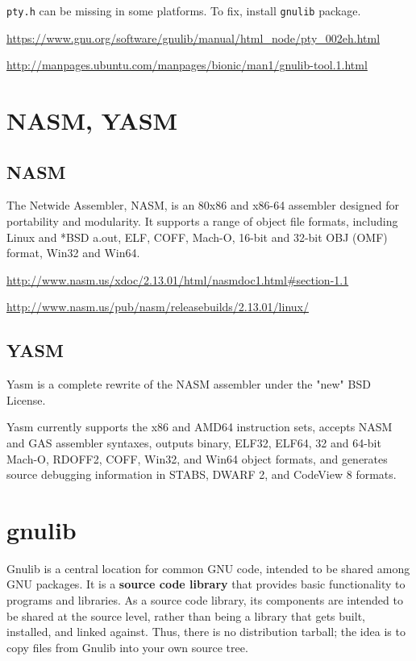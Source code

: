 \verb!pty.h! can be missing in some platforms. To fix, install \verb!gnulib! package.

\url{https://www.gnu.org/software/gnulib/manual/html_node/pty_002eh.html}

\url{http://manpages.ubuntu.com/manpages/bionic/man1/gnulib-tool.1.html}

\section{NASM, YASM}


\subsection{NASM}
\label{sec:NASM}

The Netwide Assembler, NASM, is an 80x86 and x86-64 assembler designed for
portability and modularity. It supports a range of object file formats,
including Linux and *BSD a.out, ELF, COFF, Mach-O, 16-bit and 32-bit OBJ (OMF)
format, Win32 and Win64.  

\url{http://www.nasm.us/xdoc/2.13.01/html/nasmdoc1.html#section-1.1}

\url{http://www.nasm.us/pub/nasm/releasebuilds/2.13.01/linux/}

\subsection{YASM}
\label{sec:YASM}

Yasm is a complete rewrite of the NASM assembler under the "new" BSD License.

Yasm currently supports the x86 and AMD64 instruction sets, accepts NASM and GAS
assembler syntaxes, outputs binary, ELF32, ELF64, 32 and 64-bit Mach-O, RDOFF2,
COFF, Win32, and Win64 object formats, and generates source debugging
information in STABS, DWARF 2, and CodeView 8 formats.

\section{gnulib}
\label{sec:gnulib}

Gnulib is a central location for common GNU code, intended to be shared among
GNU packages. It is a {\bf source code library} that provides basic
functionality to programs and libraries. As a source code library, its
components are intended to be shared at the source level, rather than being a
library that gets built, installed, and linked against. Thus, there is no
distribution tarball; the idea is to copy files from Gnulib into your own source
tree.

